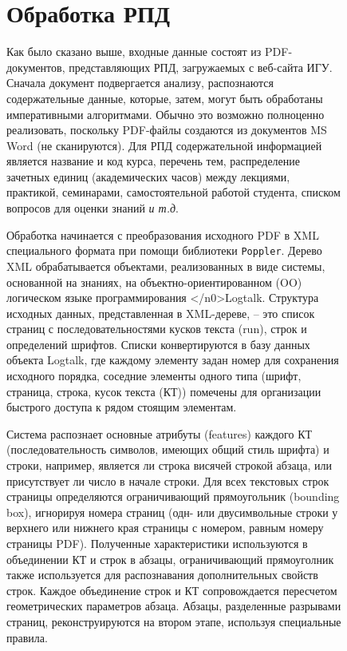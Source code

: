 \documentclass[ 

]{aiitart}
\begin{document}
\begin{figure}
\section{Обработка РПД} 

Как было сказано выше, входные данные состоят из PDF-документов, представляющих РПД, загружаемых с веб-сайта ИГУ. Сначала документ подвергается анализу, распознаются содержательные данные, которые, затем, могут быть обработаны императивными алгоритмами. Обычно это возможно полноценно реализовать, поскольку PDF-файлы создаются из документов MS Word (не сканируются). Для РПД содержательной информацией является название и код курса, перечень тем, распределение зачетных единиц (академических часов) между лекциями, практикой, семинарами, самостоятельной работой студента, списком вопросов для оценки знаний \emph{и т.д}. 

Обработка начинается с преобразования исходного PDF в XML специального формата при помощи библиотеки \verb|Poppler|. Дерево XML обрабатывается объектами, реализованных в виде системы, основанной на знаниях, на \cite{logtalk} объектно-ориентированном (OO) логическом языке программирования </n0>Logtalk. Структура исходных данных, представленная в XML-дереве, -- это список страниц с последовательностями кусков текста (run), строк и определений шрифтов. Списки конвертируются в базу данных объекта Logtalk, где каждому элементу задан номер для сохранения исходного порядка, соседние элементы одного типа (шрифт, страница, строка, кусок текста (КТ)) помечены для организации быстрого доступа к рядом стоящим элементам. 

Система распознает основные атрибуты (features) каждого КТ (последовательность символов, имеющих общий стиль шрифта) и строки, например, является ли строка висячей строкой абзаца, или присутствует ли число в начале строки. Для всех текстовых строк страницы определяются ограничивающий прямоугольник (bounding box), игнорируя номера страниц (одн- или двусимвольные строки у верхнего или нижнего края страницы с номером, равным номеру страницы PDF). Полученные характеристики используются в объединении КТ и строк в абзацы, ограничивающий прямоуголник также используется для распознавания дополнительных свойств строк. Каждое объединение строк и КТ сопровождается пересчетом геометрических параметров абзаца. Абзацы, разделенные разрывами страниц, реконструируются на втором этапе, используя специальные правила. 


\end{figure}
\end{document}
